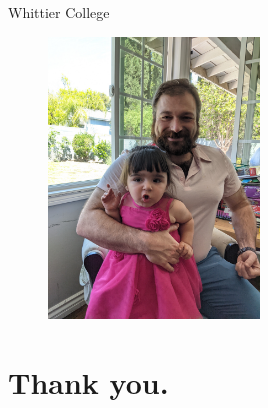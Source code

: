 \documentclass{beamer}
\begin{document}
\begin{frame}{Whittier College}
\begin{figure}
\includegraphics[width=0.5\textwidth]{photo2.jpg}
\end{figure}
\end{frame}


\section{Thank you.}
\end{document}
